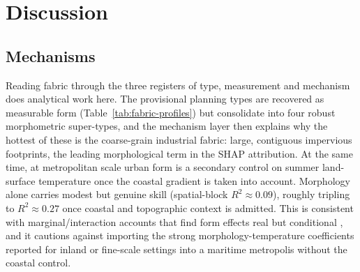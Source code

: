 \section{Discussion}
\label{sec:discussion}

\subsection{Mechanisms}
\label{sec:disc-mechanism}
Reading fabric through the three registers of type, measurement and mechanism does
analytical work here. The provisional planning types are recovered as measurable
form (Table~\ref{tab:fabric-profiles}) but consolidate into four robust
morphometric super-types, and the mechanism layer then explains why the
hottest of these is the coarse-grain industrial fabric: large, contiguous
impervious footprints, the leading morphological term in the SHAP attribution. At
the same time, at metropolitan scale urban form is a secondary control on summer
land-surface temperature once the coastal gradient is taken into account.
Morphology alone carries modest but genuine skill
(spatial-block $R^2 \approx 0.09$), roughly tripling to $R^2 \approx 0.27$ once
coastal and topographic context is admitted. This is consistent with marginal/interaction
accounts that find form effects real but conditional \citep{wangZ2025MarginalInteraction},
and it cautions against importing the strong morphology-temperature coefficients
reported for inland or fine-scale settings \citep{liu2026Nonlinear, li2026BlockGrid}
into a maritime metropolis without the coastal control.

